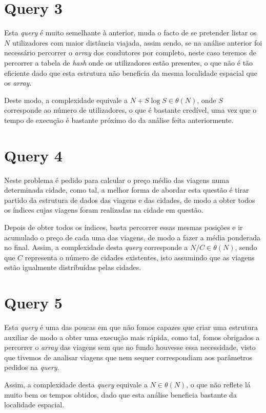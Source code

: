 \documentclass[12pt,a4paper]{report}
\begin{document}
\section{Query 3}

Esta \textit{query} é muito semelhante à anterior, muda o facto de se pretender listar os \(N\) utilizadores com maior distância viajada, assim sendo, se na análise anterior foi necessário percorrer o \textit{array} dos condutores por completo, neste caso teremos de percorrer a tabela de \textit{hash} onde os utilizadores estão presentes, o que não é tão eficiente dado que esta estrutura não beneficia da mesma localidade espacial que os \textit{array}.

Deste modo, a complexidade equivale a \(N + S\log S\in\theta(N)\), onde \(S\) corresponde ao número de utilizadores, o que é bastante credível, uma vez que o tempo de execução é bastante próximo do da análise feita anteriormente.

\section{Query 4}

Neste problema é pedido para calcular o preço médio das viagens numa determinada cidade, como tal, a melhor forma de abordar esta questão é tirar partido da estrutura de dados das viagens e das cidades, de modo a obter todos os índices cujas viagens foram realizadas na cidade em questão.

Depois de obter todos os índices, basta percorrer essas mesmas posições e ir acumulado o preço de cada uma das viagens, de modo a fazer a média ponderada no final. Assim, a complexidade desta \textit{query} corresponde a \(N/C \in\theta(N)\), sendo que \(C\) representa o número de cidades existentes, isto assumindo que as viagens estão igualmente distribuídas pelas cidades.

\section{Query 5}

Esta \textit{query} é uma das poucas em que não fomos capazes que criar uma estrutura auxiliar de modo a obter uma execução mais rápida, como tal, fomos obrigados a percorrer o \textit{array} das viagens sem que no fundo houvesse essa necessidade, visto que tivemos de analisar viagens que nem sequer correspondiam aos parâmetros pedidos na \textit{query}.

Assim, a complexidade desta \textit{query} equivale a \(N \in \theta(N)\), o que não reflete lá muito bem os tempos obtidos, dado que esta análise beneficia bastante da localidade espacial.
\end{document}
